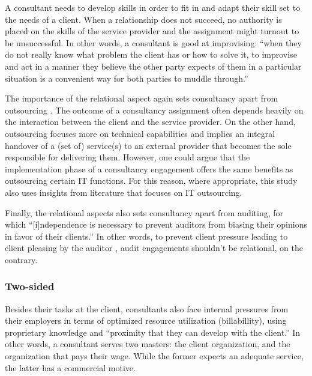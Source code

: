 \documentclass[12pt]{article}
\begin{document}
A consultant needs to develop skills in order to fit in and adapt their
skill set to the needs of a client. When a relationship does not
succeed, no authority is placed on the skills of the service provider
\citep[ 10]{furusten2000} and the assignment might turnout to be
unsuccessful. In other words, a consultant is good at improvising:
``when they do not really know what problem the client has or how to
solve it, to improvise and act in a manner they believe the other party
expects of them in a particular situation is a convenient way for both
parties to muddle through.'' \citep[ 270]{furusten2009}

The importance of the relational aspect again sets consultancy apart
from outsourcing \citep[ 171-173]{kipping2012}. The outcome of a
consultancy assignment often depends heavily on the interaction between
the client and the service provider. On the other hand, outsourcing
focuses more on technical capabilities and implies an integral handover
of a (set of) service(s) to an external provider that becomes the sole
responsible for delivering them. However, one could argue that the
implementation phase of a consultancy engagement offers the same
benefits as outsourcing certain IT functions. For this reason, where
appropriate, this study also uses insights from literature that focuses
on IT outsourcing.

Finally, the relational aspects also sets consultancy apart from
auditing, for which ``{[}i{]}ndependence is necessary to prevent
auditors from biasing their opinions in favor of their clients.''
\citep[ 310]{bazerman2011} In other words, to prevent client pressure
leading to client pleasing by the auditor \citep{koch2017}, audit
engagements shouldn't be relational, on the contrary.

\hypertarget{two-sided}{%
\subsubsection{Two-sided}\label{two-sided}}

Besides their tasks at the client, consultants also face internal
pressures from their employers in terms of optimized resource
utilization (billabillity), using proprietary knowledge and ``proximity
that they can develop with the client.'' \citet[138]{chowdhury2021} In
other words, a consultant serves two masters: the client organization,
and the organization that pays their wage. While the former expects an
adequate service, the latter has a commercial motive. \citep[
270]{furusten2012}
\end{document}
